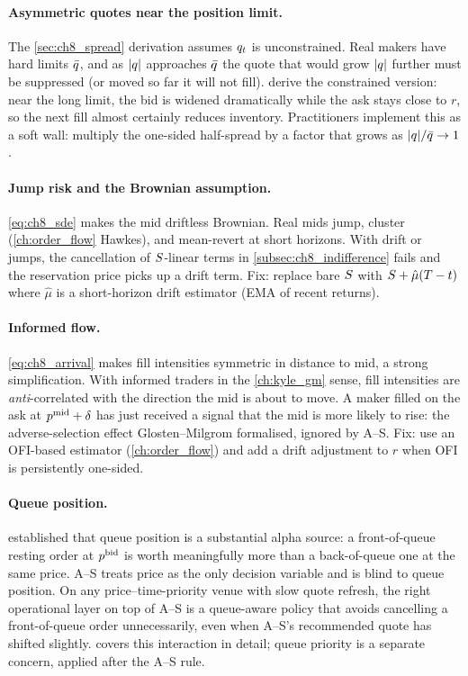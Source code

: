 \paragraph{Asymmetric quotes near the position limit.} The
\cref{sec:ch8_spread} derivation assumes $q_t$ is unconstrained.
Real makers have hard limits $\bar{q}$, and as $|q|$
approaches $\bar{q}$ the quote that would grow $|q|$
further must be suppressed (or moved so far it will not fill).
\citeCartea{} derive the constrained version: near the long limit,
the bid is widened dramatically while the ask stays close to $r$,
so the next fill almost certainly reduces inventory. Practitioners
implement this as a soft wall: multiply the one-sided half-spread
by a factor that grows as $|q|/\bar{q} \to 1$.

\paragraph{Jump risk and the Brownian assumption.}
\eqref{eq:ch8_sde} makes the mid driftless Brownian. Real mids
jump, cluster (\cref{ch:order_flow} Hawkes), and mean-revert at
short horizons. With drift or jumps, the cancellation of
$S$-linear terms in \cref{subsec:ch8_indifference} fails and the
reservation price picks up a drift term. Fix: replace bare $S$
with $S + \hat{\mu}(T - t)$ where $\hat{\mu}$ is a
short-horizon drift estimator (EMA of recent returns).

\paragraph{Informed flow.} \eqref{eq:ch8_arrival} makes fill
intensities symmetric in distance to mid, a strong
simplification. With informed traders in the \cref{ch:kyle_gm}
sense, fill intensities are \emph{anti}-correlated with the
direction the mid is about to move. A maker filled on the ask at
$p^{\mathrm{mid}} + \delta$ has just received a signal that the mid is more
likely to rise: the adverse-selection effect Glosten--Milgrom
formalised, ignored by A--S. Fix: use an OFI-based estimator
(\cref{ch:order_flow}) and add a drift adjustment to $r$ when OFI
is persistently one-sided.

\paragraph{Queue position.}  established that
queue position is a substantial alpha source: a front-of-queue
resting order at $p^{\mathrm{bid}}$ is worth meaningfully more than a
back-of-queue one at the same price. A--S treats price as the only
decision variable and is blind to queue position. On any
price--time-priority venue with slow quote refresh, the right
operational layer on top of A--S is a queue-aware policy that
avoids cancelling a front-of-queue order unnecessarily, even when
A--S's recommended quote has shifted slightly. \citeBouchaud{}
covers this interaction in detail; queue priority is a separate
concern, applied after the A--S rule.

